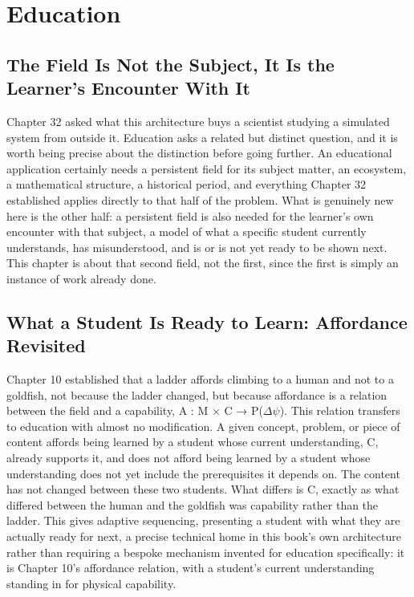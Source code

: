 \chapter{Education}

\section{The Field Is Not the Subject, It Is the Learner's Encounter With It}

Chapter 32 asked what this architecture buys a scientist studying a simulated system from outside it. Education asks a related but distinct question, and it is worth being precise about the distinction before going further. An educational application certainly needs a persistent field for its subject matter, an ecosystem, a mathematical structure, a historical period, and everything Chapter 32 established applies directly to that half of the problem. What is genuinely new here is the other half: a persistent field is also needed for the learner's own encounter with that subject, a model of what a specific student currently understands, has misunderstood, and is or is not yet ready to be shown next. This chapter is about that second field, not the first, since the first is simply an instance of work already done.

\section{What a Student Is Ready to Learn: Affordance Revisited}

Chapter 10 established that a ladder affords climbing to a human and not to a goldfish, not because the ladder changed, but because affordance is a relation between the field and a capability, A : M × C → P(\(\Delta\psi\)). This relation transfers to education with almost no modification. A given concept, problem, or piece of content affords being learned by a student whose current understanding, C, already supports it, and does not afford being learned by a student whose understanding does not yet include the prerequisites it depends on. The content has not changed between these two students. What differs is C, exactly as what differed between the human and the goldfish was capability rather than the ladder. This gives adaptive sequencing, presenting a student with what they are actually ready for next, a precise technical home in this book's own architecture rather than requiring a bespoke mechanism invented for education specifically: it is Chapter 10's affordance relation, with a student's current understanding standing in for physical capability.

